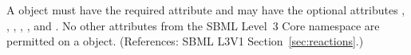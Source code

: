 A \LocalParameter object must have the required attribute  and
may have the optional attributes , , , ,
,  and .  No other attributes from
the SBML Level~3 Core namespace are permitted on a \LocalParameter object.
(References: SBML L3V1 Section~\ref{sec:reactions}.)

